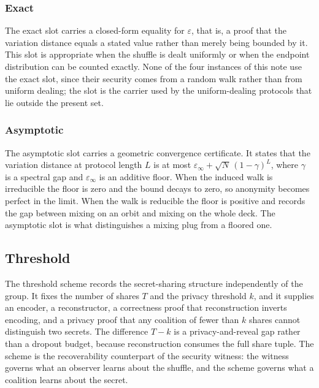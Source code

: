 \documentclass[a4paper,11pt]{article}
\begin{document}
\subsubsection{Exact}

The exact slot carries a closed-form equality for $\varepsilon$, that is, a proof
that the variation distance equals a stated value rather than merely being
bounded by it. This slot is appropriate when the shuffle is dealt uniformly or
when the endpoint distribution can be counted exactly. None of the four
instances of this note use the exact slot, since their security comes from a
random walk rather than from uniform dealing; the slot is the carrier used by
the uniform-dealing protocols that lie outside the present set.

\subsubsection{Asymptotic}

The asymptotic slot carries a geometric convergence certificate. It states that
the variation distance at protocol length $L$ is at most
$\varepsilon_\infty + \sqrt{N}\,(1-\gamma)^{L}$, where $\gamma$ is a spectral
gap and $\varepsilon_\infty$ is an additive floor. When the induced walk is
irreducible the floor is zero and the bound decays to zero, so anonymity becomes
perfect in the limit. When the walk is reducible the floor is positive and
records the gap between mixing on an orbit and mixing on the whole deck. The
asymptotic slot is what distinguishes a mixing plug from a floored one.

\subsection{Threshold}

The threshold scheme records the secret-sharing structure independently of the
group. It fixes the number of shares $T$ and the privacy threshold $k$, and it
supplies an encoder, a reconstructor, a correctness proof that reconstruction
inverts encoding, and a privacy proof that any coalition of fewer than $k$
shares cannot distinguish two secrets. The difference $T-k$ is a
privacy-and-reveal gap rather than a dropout budget, because reconstruction
consumes the full share tuple. The scheme is the recoverability counterpart of
the security witness: the witness governs what an observer learns about the
shuffle, and the scheme governs what a coalition learns about the secret.
\end{document}
